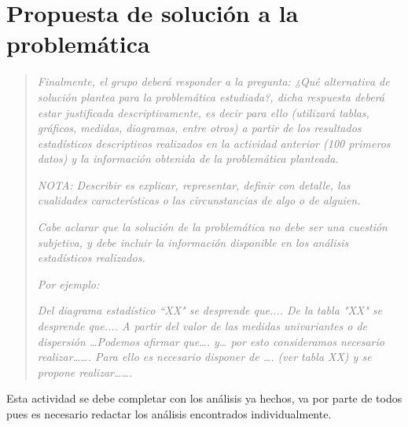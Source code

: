 \section*{Propuesta de solución a la problemática}
\begin{quotation}
    \emph{\textcolor{gray}{Finalmente, el grupo deberá responder a la pregunta: ¿Qué alternativa de solución plantea para la problemática estudiada?, dicha respuesta deberá estar justificada descriptivamente, es decir para ello (utilizará tablas, gráficos, medidas, diagramas, entre otros) a partir de los resultados estadísticos descriptivos realizados en la actividad anterior (100 primeros datos) y la información obtenida de la problemática planteada.}}\par
    \emph{\textcolor{gray}{NOTA: Describir es explicar, representar, definir con detalle, las cualidades características o las circunstancias de algo o de alguien.}}\par
    \emph{\textcolor{gray}{Cabe aclarar que la solución de la problemática no debe ser una cuestión subjetiva, y debe incluir la información disponible en los análisis estadísticos realizados.}}\par
    \emph{\textcolor{gray}{Por ejemplo:}}\par
    \emph{\textcolor{gray}{Del diagrama estadístico “XX" se desprende que.... De la tabla "XX" se desprende que.... A partir del valor de las medidas univariantes o de dispersión …Podemos afirmar que…. y… por esto consideramos necesario realizar……. Para ello es necesario disponer de …. (ver tabla XX) y se propone realizar…….}}
\end{quotation}
Esta actividad se debe completar con los análisis ya hechos, va por parte de todos pues es necesario redactar los análisis encontrados individualmente.